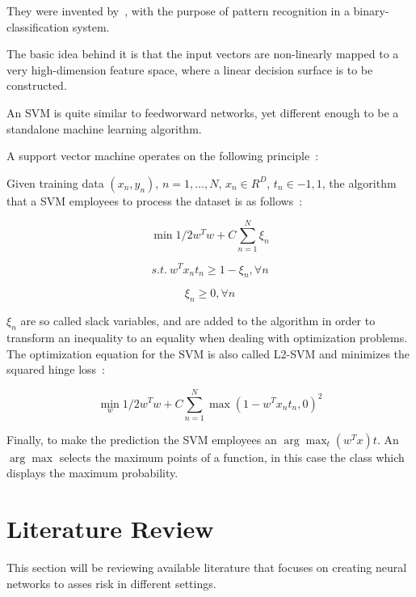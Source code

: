 \documentclass[12pt]{article}
\begin{document}
They were invented by~\citet{svm.pdf}, with the purpose of pattern recognition in a binary-classification system.

The basic idea behind it is that the input vectors are non-linearly mapped to a very high-dimension feature space, where a linear decision surface is to be constructed. 

An SVM is quite similar to feedworward networks, yet different enough to be a standalone machine learning algorithm. 

A support vector machine operates on the following principle~\citep{dlsvm}:

Given training data $(x_n,y_n)$, $n=1,\ldots,N$, $x_n \in R^D$, $t_n \in {-1,1}$, the algorithm that a SVM employees to process the dataset is as follows~\citep{dlsvm}:

\begin{equation}
    \min1/2w^Tw + C\sum_{n=1}^{N}{\xi_n}
\end{equation}

\begin{equation}
    s.t.\ w^Tx_nt_n \geq 1-\xi_n, \forall n
\end{equation}

\begin{equation}
    \xi_n \geq 0, \forall n
\end{equation}

$\xi_n$ are so called slack variables, and are added to the algorithm in order to transform an inequality to an equality when dealing with optimization problems. The optimization equation for the SVM is also called L2-SVM and minimizes the squared hinge loss~\citep{dlsvm}:

\begin{equation}
   \min_{w} 1/2w^Tw+C\sum_{n=1}^{N}\max(1-w^Tx_nt_n,0)^2
\end{equation}

Finally, to make the prediction the SVM employees an $\arg \max_{t}(w^Tx)t$. An $\arg \max$ selects the maximum points of a function, in this case the class which displays the maximum probability.

\section{Literature Review}
\label{sec:literature_review}

This section will be reviewing available literature that focuses on creating neural networks to asses risk in different settings. 
\end{document}
